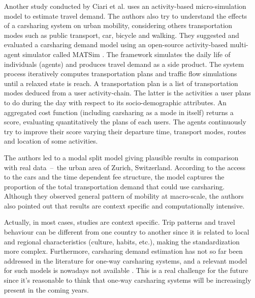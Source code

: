 \begin{bibunit}[ieeetr]
\medskip
Another study conducted by Ciari et al. \cite{ciari_estimation_2013} uses an activity-based micro-simulation model to estimate travel demand.
The authors also try to understand the effects of a carsharing system on urban mobility, considering others transportation modes such as public transport, car, bicycle and walking.
They suggested and evaluated a carsharing demand model using an open-source activity-based multi-agent simulator called MATSim \cite{matsim_webPage}.
The framework simulates the daily life of individuals (agents) and produces travel demand as a side product.
The system process iteratively computes transportation plans and traffic flow simulations until a relaxed state is reach.
A transportation plan is a list of transportation modes deduced from a user activity-chain.
The latter is the activities a user plans to do during the day with respect to its socio-demographic attributes.
An aggregated cost function (including carsharing as a mode in itself) returns a score, evaluating quantitatively the plans of each users.
The agents continuously try to improve their score varying their departure time, transport modes, routes and location of some activities.

The authors led to a modal split model giving plausible results in comparison with real \mbox{data -- the} urban area of Zurich, Switzerland.
According to the access to the cars and the time dependent fee structure, the model captures the proportion of the total transportation demand that could use carsharing.
Although they observed general pattern of mobility at macro-scale, the authors also pointed out that results are context specific and computationally intensive.


\bigskip
Actually, in most cases, studies are context specific.
Trip patterns and travel behaviour can be different from one country to another since it is related to local and regional characteristics (culture, habits, etc.), making the standardization more complex.
Furthermore, carsharing demand estimation has not so far been addressed in the literature for one-way carsharing systems, and a relevant model for such models is nowadays not available \cite{jorge_carsharing_2013}.
This is a real challenge for the future since it's reasonable to think that one-way carsharing systems will be increasingly present in the coming years.




\end{bibunit}
